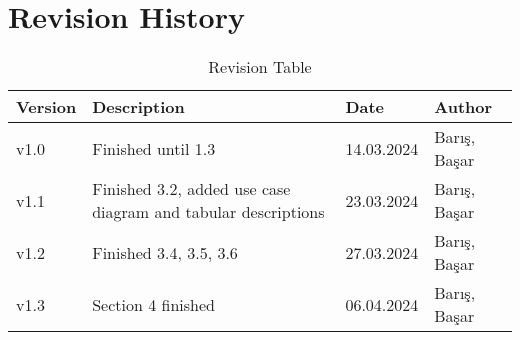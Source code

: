 \chapter*{Revision History}
 
 \begin{table}[h] 
 \centering
 \begin{tabularx}{0.8\textwidth}{|X|X|X|X|}
 \hline
Version & Description & Date & Author  \\ \hline
v1.0 &  Finished until 1.3 & 14.03.2024  & Barış, Başar    \\ \hline
v1.1 & Finished 3.2, added use case diagram and tabular descriptions  &  23.03.2024 & Barış, Başar  \\ \hline
v1.2 &  Finished 3.4, 3.5, 3.6 & 27.03.2024 & Barış, Başar   \\ \hline
v1.3 &  Section 4 finished & 06.04.2024 & Barış, Başar   \\ \hline
\end{tabularx}
\caption{Revision Table \label{Tab:Example}}

\end{table}
